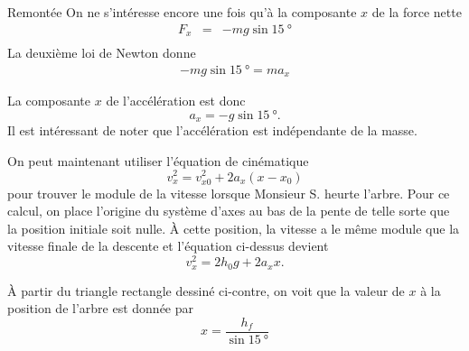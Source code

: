 \documentclass{tufte-handout}
\begin{document}
{\begin{subsection}{Remontée}
    On ne s'intéresse encore une fois qu'à la composante $x$ de la force nette
    \begin{eqnarray*}
      F_x &=& -mg \sin \SI{15}{\degree} \\
    \end{eqnarray*}
    La deuxième loi de Newton donne
    \begin{align*}
      -mg \sin \SI{15}{\degree} = ma_x
    \end{align*}

    La composante $x$ de l'accélération est donc
    \begin{equation}
      \label{eq:accxmonte}
      a_x = -g\sin\SI{15}{\degree}.
    \end{equation}
    Il est intéressant de noter que l'accélération est indépendante de la
    masse.

    On peut maintenant utiliser l'équation de cinématique
    \begin{equation*}
      v_x^2 = v_{x0}^2 + 2a_x(x - x_0)
    \end{equation*}
    pour trouver le module de la vitesse lorsque Monsieur S. heurte l'arbre.
    Pour ce calcul, on place l'origine du système d'axes au bas de la pente de
    telle sorte que la position initiale soit nulle. À cette position, la
    vitesse a le même module que la vitesse finale de la descente et l'équation
    ci-dessus devient
    \begin{equation}
      \label{eq:vaaxmonte}
      v_x^2 = 2h_0g + 2a_x x.
    \end{equation}
    \begin{marginfigure}
    \end{marginfigure}
    À partir du triangle
    rectangle dessiné ci-contre, on voit que la valeur de $x$ à la position de
    l'arbre est donnée par
    \begin{equation}
      \label{eq:xtriangmonte}
      x = \frac{h_f}{\sin\SI{15}{\degree}} 
    \end{equation}
    

\end{subsection}}
\end{document}

